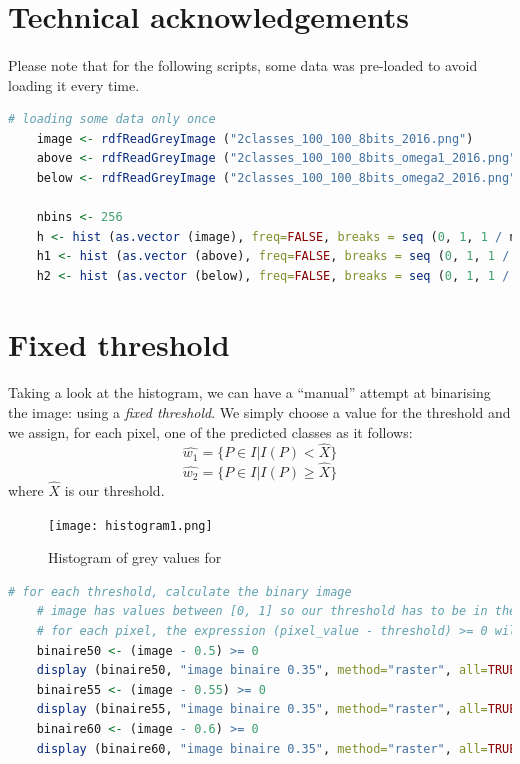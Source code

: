 \clearpage


\section{Technical acknowledgements}
\paragraph{}
Please note that for the following scripts, some data was pre-loaded to avoid loading it every time.

\begin{lstlisting}[language=R, caption=Loading some data only once]
    # loading some data only once
    image <- rdfReadGreyImage ("2classes_100_100_8bits_2016.png")
    above <- rdfReadGreyImage ("2classes_100_100_8bits_omega1_2016.png")
    below <- rdfReadGreyImage ("2classes_100_100_8bits_omega2_2016.png")

    nbins <- 256
    h <- hist (as.vector (image), freq=FALSE, breaks = seq (0, 1, 1 / nbins))
    h1 <- hist (as.vector (above), freq=FALSE, breaks = seq (0, 1, 1 / nbins))
    h2 <- hist (as.vector (below), freq=FALSE, breaks = seq (0, 1, 1 / nbins))
\end{lstlisting}

\section{Fixed threshold}
\paragraph{}
Taking a look at the histogram, we can have a ``manual'' attempt at binarising the image: using a \emph{fixed threshold}.
We simply choose a value for the threshold and we assign, for each pixel, one of the predicted classes as it follows:
$$\hat{w_1} = \{P \in I | I(P) < \hat{X}\}$$
$$\hat{w_2} = \{P \in I | I(P) \ge \hat{X}\}$$
where $\hat{X}$ is our threshold.

\begin{figure}[h]
    \centering
    \texttt{[image: histogram1.png]}
    \caption{Histogram of grey values for}
    \label{}
\end{figure}

\begin{lstlisting}[language=R, caption=Using fixed threshold]
    # for each threshold, calculate the binary image
    # image has values between [0, 1] so our threshold has to be in the same range
    # for each pixel, the expression (pixel_value - threshold) >= 0 will assign it to one of two classes: w1 or w2
    binaire50 <- (image - 0.5) >= 0
    display (binaire50, "image binaire 0.35", method="raster", all=TRUE)
    binaire55 <- (image - 0.55) >= 0
    display (binaire55, "image binaire 0.35", method="raster", all=TRUE)
    binaire60 <- (image - 0.6) >= 0
    display (binaire60, "image binaire 0.35", method="raster", all=TRUE)
\end{lstlisting}


